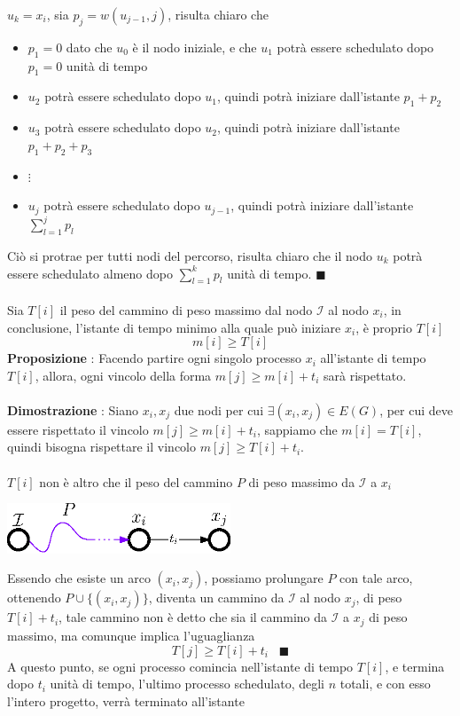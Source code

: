 \documentclass[12pt, letterpaper]{article}
\newcommand{\acc}{\\\hphantom{}\\}
\begin{document}
$u_k=x_i$, sia $p_j = w(u_{j-1},j)$, risulta chiaro che\begin{itemize}
    \item $p_1=0$ dato che $u_0$ è il nodo iniziale, e che $u_1$ potrà essere schedulato dopo $p_1=0$ unità di tempo 
    \item $u_2$ potrà essere schedulato dopo $u_1$, quindi potrà iniziare dall'istante $p_1+p_2$
    \item $u_3$ potrà essere schedulato dopo $u_2$, quindi potrà iniziare dall'istante $p_1+p_2+p_3$
    \item $\vdots$ 
    \item $u_j$ potrà essere schedulato dopo $u_{j-1}$, quindi potrà iniziare dall'istante $\displaystyle\sum_{l=1}^j p_l$
\end{itemize}
Ciò si protrae per tutti nodi del percorso, risulta chiaro che il nodo $u_k$ potrà essere schedulato almeno dopo 
$\sum_{l=1}^k p_l$ unità di tempo. $\blacksquare$\acc
Sia $T[i]$ il peso del cammino di peso massimo dal nodo $\mathcal{I}$ al nodo $x_i$, in conclusione, l'istante di tempo 
minimo alla quale può iniziare $x_i$, è proprio $T[i]$ $$ m[i]\ge T[i]$$
\textbf{Proposizione} :  Facendo partire ogni singolo processo 
$x_i$ all'istante di tempo $T[i]$, allora, ogni vincolo della forma $m[j]\ge m[i]+t_i$ sarà rispettato.\acc 
\textbf{Dimostrazione} : Siano $x_i,x_j$ due nodi per cui $\exists(x_i,x_j)\in E(G)$, per cui deve essere rispettato 
il vincolo $m[j]\ge m[i]+t_i$, sappiamo che $m[i]=T[i]$, quindi bisogna rispettare il vincolo 
$m[j]\ge T[i]+t_i$.\acc 
$T[i]$ non è altro che il peso del cammino $P$ di peso massimo da $\mathcal{I}$ a $x_i$\begin{center}
    \includegraphics[width=0.5\textwidth ]{images/dimScheduling.eps}
\end{center}
Essendo che esiste un arco $(x_i,x_j)$, possiamo prolungare $P$ con tale arco, ottenendo $P\cup \{(x_i,x_j)\}$, diventa un 
cammino da $\mathcal{I}$ al nodo $x_j$, di peso $T[i]+t_i$, tale cammino non è detto che sia il cammino da 
$\mathcal{I}$ a $x_j$ di peso massimo, ma comunque implica l'uguaglianza $$ T[j]\ge T[i]+t_i\;\;\;\blacksquare$$
A questo punto, se ogni processo comincia nell'istante di tempo $T[i]$, e termina dopo $t_i$ unità di tempo, l'ultimo processo 
schedulato, degli $n$ totali, e con esso l'intero progetto, verrà terminato all'istante
\end{document}

